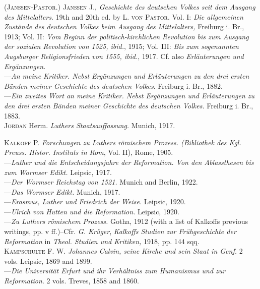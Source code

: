 (\textsc{Janssen-Pastor.}) \textsc{Janssen J.}, \textit{Geschichte des deutschen Volkes seit dem
Ausgang des Mittelalters}. 19th and 20th ed. by \textsc{L. von Pastor}. Vol. I: \textit{Die
allgemeinen Zustände des deutschen Volkes beim Ausgang des Mittelalters,}
Freiburg i. Br., 1913; Vol. II: \textit{Vom Beginn der politisch-kirchlichen Revolution
bis zum Ausgang der sozialen Revolution von 1525, ibid.}, 1915;
Vol. III: \textit{Bis zum sogenannten Augsburger Religionsfrieden von 1555, ibid.},
1917. Cf. also \textit{Erläuterungen und Ergänzungen.} \\
---\textit{An meine Kritiker. Nebst Ergänzungen und Erläuterungen zu den
drei ersten Bänden meiner Geschichte des deutschen Volkes}. Freiburg i.
Br., 1882. \\
---\textit{Ein zweites Wort an meine Kritiker. Nebst Ergänzungen und Erläuterungen
	zu den drei ersten Bänden meiner Geschichte des deutschen
Volkes.} Freiburg i. Br., 1883. \\

\textsc{Jordan} Herm. \textit{Luthers Staatsauffassung.} Munich, 1917.

\textsc{Kalkoff P.} \textit{Forschungen zu Luthers römischem Prozess. (Bibliothek des
Kgl. Preuss. Histor. Instituts in Rom}, Vol. II), Rome, 1905. \\
---\textit{Luther und die Entscheidungsjahre der Reformation. Von den Ablassthesen
bis zum Wormser Edikt.} Leipsic, 1917. \\
---\textit{Der Wormser Reichstag von 1521.} Munich and Berlin, 1922. \\
---\textit{Das Wormser Edikt.} Munich, 1917. \\
---\textit{Erasmus, Luther und Friedrich der Weise.} Leipsic, 1920. \\
---\textit{Ulrich von Hutten und die Reformation.} Leipsic, 1920. \\
---\textit{Zu Luthers römischem Prozess.} Gotha, 1912 (with a list of Kalkoffs
previous writings, pp. v ff.)--Cfr. \textit{G. Krüger}, \textit{Kalkoffs Studien zur
Frühgeschichte der Reformation} in \textit{Theol. Studien und Kritiken,} 1918,
pp. 144 sqq. \\

\textsc{Kampschulte F. W.} \textit{Johannes Calvin, seine Kirche und sein Staat in Genf.}
2 vols. Leipsic, 1869 and 1899. \\
---\textit{Die Universität Erfurt und ihr Verhältniss zum Humanismus und
zur Reformation}. 2 vols. Treves, 1858 and 1860. \\

